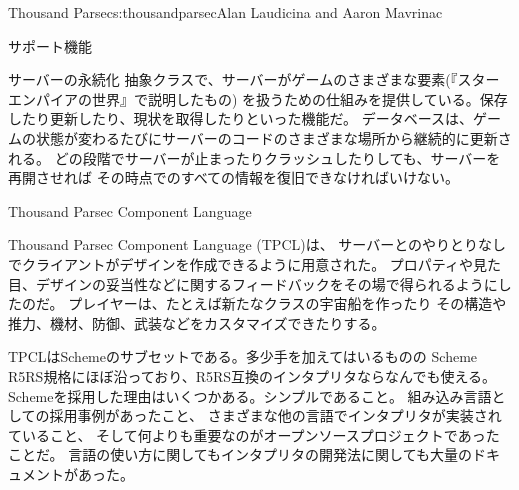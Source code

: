 \begin{aosachapter}{Thousand Parsec}{s:thousandparsec}{Alan Laudicina and Aaron Mavrinac}
\begin{aosasect1}{サポート機能}
\begin{aosasect2}{サーバーの永続化}
抽象クラスで、サーバーがゲームのさまざまな要素(『スターエンパイアの世界』で説明したもの)
を扱うための仕組みを提供している。保存したり更新したり、現状を取得したりといった機能だ。
データベースは、ゲームの状態が変わるたびにサーバーのコードのさまざまな場所から継続的に更新される。
どの段階でサーバーが止まったりクラッシュしたりしても、サーバーを再開させれば
その時点でのすべての情報を復旧できなければいけない。

\end{aosasect2}

\begin{aosasect2}{Thousand Parsec Component Language}

Thousand Parsec Component Language (TPCL)は、
サーバーとのやりとりなしでクライアントがデザインを作成できるように用意された。
プロパティや見た目、デザインの妥当性などに関するフィードバックをその場で得られるようにしたのだ。
プレイヤーは、たとえば新たなクラスの宇宙船を作ったり
その構造や推力、機材、防御、武装などをカスタマイズできたりする。

TPCLはSchemeのサブセットである。多少手を加えてはいるものの
Scheme R5RS規格にほぼ沿っており、R5RS互換のインタプリタならなんでも使える。
Schemeを採用した理由はいくつかある。シンプルであること。
組み込み言語としての採用事例があったこと、
さまざまな他の言語でインタプリタが実装されていること、
そして何よりも重要なのがオープンソースプロジェクトであったことだ。
言語の使い方に関してもインタプリタの開発法に関しても大量のドキュメントがあった。


\end{aosasect2}
\end{aosasect1}
\end{aosachapter}
